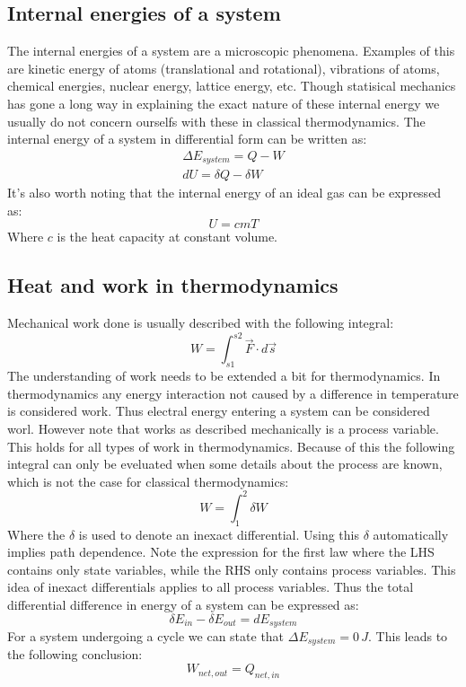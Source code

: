 \documentclass[11pt, a4paper]{article}
\begin{document}
\subsection{Internal energies of a system}
The internal energies of a system are a microscopic phenomena. Examples of this are kinetic energy of atoms (translational and rotational), vibrations of atoms, chemical energies, nuclear energy, lattice energy, etc. Though statisical mechanics has gone a long way in explaining the exact nature of these internal energy we usually do not concern ourselfs with these in classical thermodynamics. The internal energy of a system in differential form can be written as:
\begin{gather}
  \Delta E_{system} = Q - W\\
  dU = \delta Q - \delta W
\end{gather}
It's also worth noting that the internal energy of an ideal gas can be expressed as:
\begin{equation}
  U = cmT
\end{equation}
Where $c$ is the heat capacity at constant volume. 

\subsection{Heat and work in thermodynamics}
Mechanical work done is usually described with the following integral:
\begin{equation}
  W = \int_{s1}^{s2} \vec{F}\cdot d\vec{s}
\end{equation}
The understanding of work needs to be extended a bit for thermodynamics. In thermodynamics any energy interaction not caused by a difference in temperature is considered work. Thus electral energy entering a system can be considered worl. However note that works as described mechanically is a process variable. This holds for all types of work in thermodynamics. Because of this the following integral can only be eveluated when some details about the process are known, which is not the case for classical thermodynamics:
\begin{equation}
  W = \int_1^2 \delta W
\end{equation}
Where the $\delta$ is used to denote an inexact differential. Using this $\delta$ automatically implies path dependence. Note the expression for the first law where the LHS contains only state variables, while the RHS only contains process variables. This idea of inexact differentials applies to all process variables. Thus the total differential difference in energy of a system can be expressed as:
\begin{equation}
  \delta E_{in} - \delta E_{out} = dE_{system}
\end{equation}
For a system undergoing a cycle we can state that $\Delta E_{system} = 0\,J$. This leads to the following conclusion:
\begin{equation}
  W_{net,out} = Q_{net,in}
\end{equation}
\end{document}
